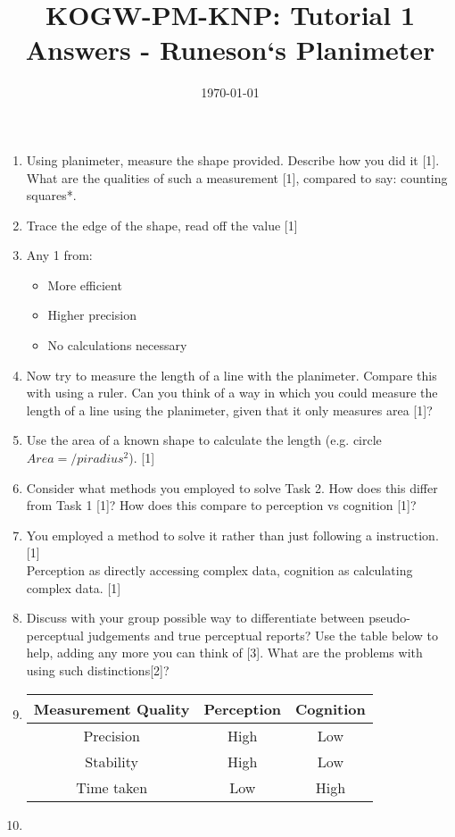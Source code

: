 \documentclass[12pt,english]{scrartcl}
\title{KOGW-PM-KNP: Tutorial 1 Answers - Runeson`s Planimeter}
\author{}
\date{\today}
\begin{document}
\maketitle

\begin{enumerate}
 \item Using planimeter, measure the shape provided. Describe how you did it [1]. What are the qualities of such a measurement [1], compared to say: counting squares*.
 \item[]
 \color{blue}
 Trace the edge of the shape, read off the value [1] 
 \item[]
 Any 1 from:
 \begin{itemize}
 \item More efficient
 \item Higher precision
 \item No calculations necessary 
 \end{itemize} 
 
 \color{black}
 \item Now try to measure the length of a line with the planimeter. Compare this with using a ruler. Can you think of a way in which you could measure the length of a line using the planimeter, given that it only measures area [1]?
 \item[]
 \color{blue}
 Use the area of a known shape to calculate the length (e.g. circle $Area =/pi radius^2 $). [1]
 
 \color{black}
 \item Consider what methods you employed to solve Task 2. How does this differ from Task 1 [1]? How does this compare to perception vs cognition [1]?
 \item[]
 \color{blue}
 You employed a method to solve it rather than just following a instruction. [1] \\
 Perception as directly accessing complex data, cognition as calculating complex data. [1]
 
 \color{black}
 \item Discuss with your group possible way to differentiate between pseudo-perceptual judgements and true perceptual reports? Use the table below to help, adding any more you can think of [3]. What are the problems with using such distinctions[2]?
 \item[]

  \begin{center}
   \begin{tabular}{ || c c c || } 
   \hline
   Measurement Quality & Perception & Cognition \\ 
   \hline
   Precision & \color{blue} High & \color{blue} Low  \\ 
   \hline
   Stability & \color{blue} High & \color{blue} Low  \\ 
   \hline
   Time taken  & \color{blue} Low  & \color{blue} High \\
   \hline
   \end{tabular}
  \end{center}
  \item[]
  

\end{enumerate}
\end{document}
